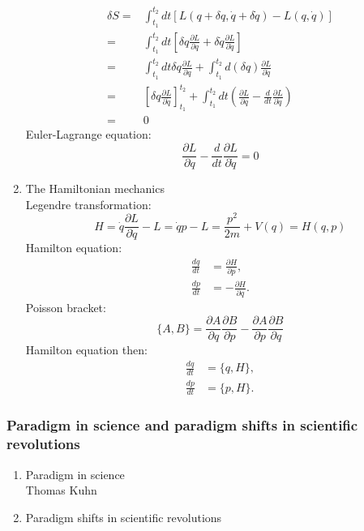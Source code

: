 \documentclass[12pt]{article}
\numberwithin{equation}{section}
\begin{document}
\begin{enumerate}
\begin{equation}
\begin{aligned}
	\delta S =& \int_{t_1}^{t_2}dt[L(q+\delta q, \dot{q}+\delta \dot{q})-L(q,\dot{q})] \\
	=&\int_{t_1}^{t_2}dt[\delta q \frac{\partial L}{\partial q}+\delta \dot{q} \frac{\partial L}{\partial \dot{q}}] \\
	=&\int_{t_1}^{t_2}dt\delta q \frac{\partial L}{\partial q}+\int_{t_1}^{t_2}d(\delta q) \frac{\partial L}{\partial \dot{q}} \\
	=&[\delta q \frac{\partial L}{\partial \dot{q}}]_{t_1}^{t_2}+\int_{t_1}^{t_2}dt(\frac{\partial L}{\partial q}-\frac{d}{dt}\frac{\partial L}{\partial \dot{q}}) \\
	=&0
	\end{aligned}\end{equation}
	Euler-Lagrange equation:
	\begin{equation}\frac{\partial L}{\partial q}-\frac{d}{dt}\frac{\partial L}{\partial \dot{q}}=0\end{equation}
\item The Hamiltonian mechanics \\
	Legendre transformation:
	\begin{equation}
	H=\dot{q}\frac{\partial L}{\partial \dot{q}}-L=\dot{q}p-L=\frac{p^2}{2m}+V(q)=H(q,p)
	\end{equation}
	Hamilton equation:
	\begin{equation}\begin{aligned}
	\frac{dq}{dt}&=\frac{\partial H}{\partial p},\\
	\frac{dp}{dt}&=-\frac{\partial H}{\partial q}.
	\end{aligned}\end{equation}
	Poisson bracket:
	\begin{equation}
	\{A, B\}=\frac{\partial A}{\partial q}\frac{\partial B}{\partial p} -\frac{\partial A}{\partial p}\frac{\partial B}{\partial q} 
	\end{equation}
	Hamilton equation then:
	\begin{equation}\begin{aligned}
	\frac{dq}{dt}&=\{q, H\},\\
	\frac{dp}{dt}&=\{p, H\}.
	\end{aligned}\end{equation}
\end{enumerate}
\subsubsection{Paradigm in science and paradigm shifts in scientific revolutions}
\begin{enumerate}
\item Paradigm in science\\
Thomas Kuhn
\item Paradigm shifts in scientific revolutions
\end{enumerate}
\end{document}
